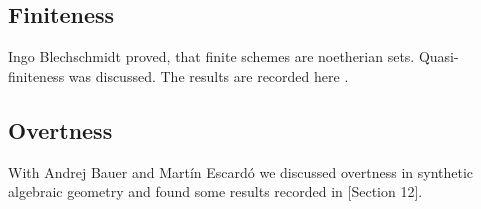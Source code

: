 
\subsection{Finiteness}
Ingo Blechschmidt proved, that finite schemes are noetherian sets.
Quasi-finiteness was discussed.
The results are recorded here \cite{finite-draft}.

\subsection{Overtness}
With Andrej Bauer and Martín Escardó we discussed overtness in synthetic algebraic geometry and found some results recorded in \cite{random-draft}[Section 12].
